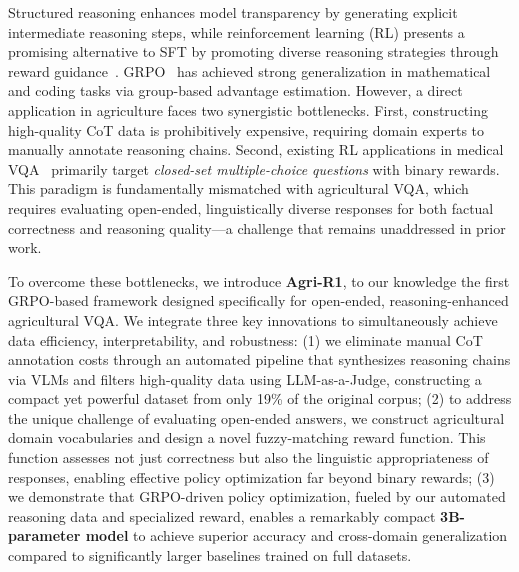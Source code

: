 \documentclass[sigconf,anonymous,review]{acmart}
\begin{document}
Structured reasoning enhances model transparency by generating explicit intermediate reasoning steps, while reinforcement learning (RL) presents a promising alternative to SFT by promoting diverse reasoning strategies through reward guidance~\cite{shakya2023reinforcement}. GRPO~\cite{shao2024deepseekmath,wang2025grpo,tong2025delving} has achieved strong generalization in mathematical and coding tasks via group-based advantage estimation. However, a direct application in agriculture faces two synergistic bottlenecks. First, constructing high-quality CoT data is prohibitively expensive, requiring domain experts to manually annotate reasoning chains. Second, existing RL applications in medical VQA~\cite{yi2022automated,hu2023reinforcement} primarily target \emph{closed-set multiple-choice questions} with binary rewards.
This paradigm is fundamentally mismatched with agricultural VQA, which requires evaluating open-ended, linguistically diverse responses for both factual correctness and reasoning quality---a challenge that remains unaddressed in prior work.

To overcome these bottlenecks, we introduce \textbf{Agri-R1}, to our knowledge the first GRPO-based framework designed specifically for open-ended, reasoning-enhanced agricultural VQA. We integrate three key innovations to simultaneously achieve data efficiency, interpretability, and robustness: (1) we eliminate manual CoT annotation costs through an automated pipeline that synthesizes reasoning chains via VLMs and filters high-quality data using LLM-as-a-Judge, constructing a compact yet powerful dataset from only 19\% of the original corpus; (2) to address the unique challenge of evaluating open-ended answers, we construct agricultural domain vocabularies and design a novel fuzzy-matching reward function. This function assesses not just correctness but also the linguistic appropriateness of responses, enabling effective policy optimization far beyond binary rewards; (3) we demonstrate that GRPO-driven policy optimization, fueled by our automated reasoning data and specialized reward, enables a remarkably compact \textbf{3B-parameter model} to achieve superior accuracy and cross-domain generalization compared to significantly larger baselines trained on full datasets.
\end{document}
